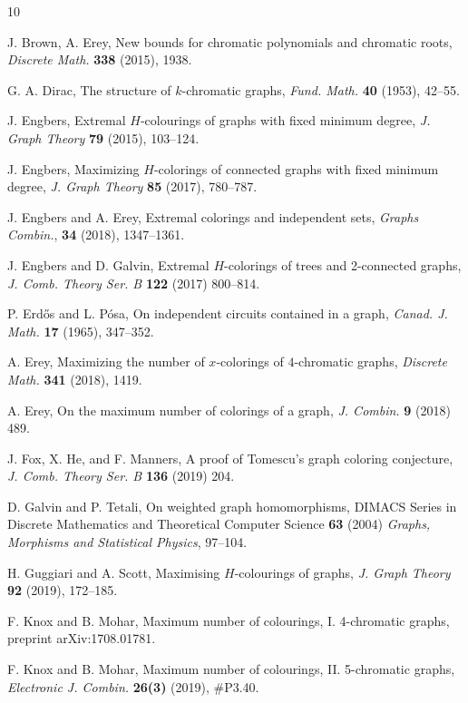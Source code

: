 \documentclass[11pt]{article}
\theoremstyle{plain}
\theoremstyle{definition}
\theoremstyle{remark}
\begin{document}
\begin{thebibliography}{10}

 J. Brown, A. Erey, New bounds for chromatic polynomials and chromatic roots, {\it Discrete Math.} {\bf 338} (2015), 1938.

 G. A. Dirac, The structure of $k$-chromatic graphs, {\it Fund. Math.} {\bf 40} (1953), 42--55.

J. Engbers, Extremal $H$-colourings of graphs with fixed minimum degree, {\em J. Graph Theory} {\bf 79} (2015), 103--124.

J. Engbers, Maximizing $H$-colorings of connected graphs with fixed minimum degree, {\em J. Graph
Theory} {\bf 85} (2017), 780--787.

 J. Engbers and A. Erey, Extremal colorings and independent sets, {\it Graphs Combin.}, {\bf 34} (2018), 1347--1361.

J. Engbers and D. Galvin, Extremal $H$-colorings of trees and 2-connected graphs, {\em J. Comb.
Theory Ser. B} {\bf 122} (2017) 800--814.

P. Erd\H{o}s and L. P\'{o}sa, On independent circuits contained in a graph, {\em Canad. J. Math.} {\bf 17} (1965), 347--352.

 A. Erey, Maximizing the number of $x$-colorings of $4$-chromatic graphs, {\it Discrete Math.} {\bf 341} (2018), 1419.

 A. Erey, On the maximum number of colorings of a graph, {\it J. Combin.} {\bf 9} (2018) 489.

 J. Fox, X. He, and F. Manners, A proof of Tomescu's graph coloring conjecture, {\it J. Comb. Theory Ser. B} {\bf 136} (2019) 204.

D. Galvin and P. Tetali, On weighted graph homomorphisms, DIMACS Series in Discrete
Mathematics and Theoretical Computer Science {\bf 63} (2004) {\em Graphs, Morphisms and Statistical
Physics}, 97--104.

 H. Guggiari and A. Scott, Maximising $H$-colourings of graphs, {\em J. Graph Theory} {\bf 92} (2019), 172--185.

F. Knox and B. Mohar, Maximum number of colourings,
I. 4-chromatic graphs, preprint arXiv:1708.01781.

F. Knox and B. Mohar, Maximum number of colourings,
II. 5-chromatic graphs, {\em Electronic J. Combin.} {\bf 26(3)} (2019), \#P3.40.


\end{thebibliography}
\end{document}
